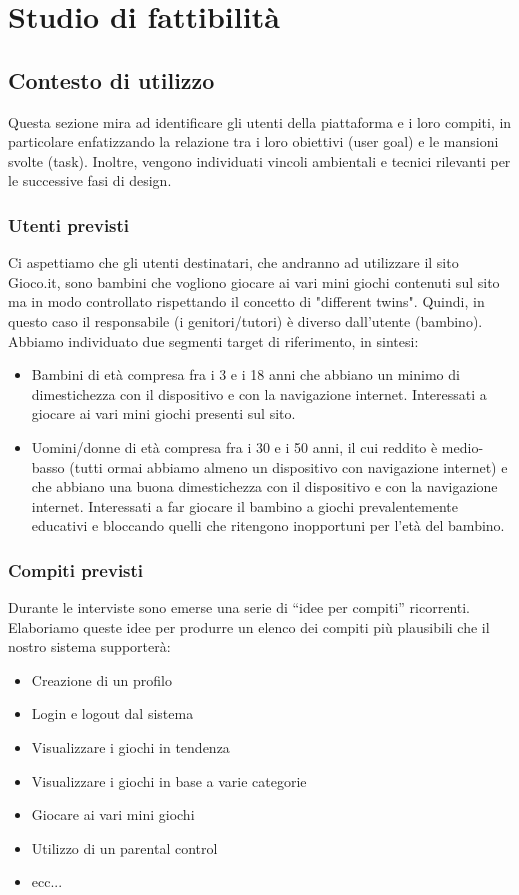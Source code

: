 \documentclass[../Report.tex]{subfiles}
\begin{document}
    \chapter{Studio di fattibilità}
    \section{Contesto di utilizzo}
    Questa sezione mira ad identificare gli utenti della piattaforma e i loro compiti, in particolare enfatizzando la relazione tra i loro obiettivi (user goal) e le mansioni svolte (task). Inoltre, vengono individuati vincoli ambientali e tecnici rilevanti per le successive fasi di design.
        
        \subsection{Utenti previsti}
        Ci aspettiamo che gli utenti destinatari, che andranno ad utilizzare il sito Gioco.it, sono bambini che vogliono giocare ai vari mini giochi contenuti sul sito ma in modo controllato rispettando il concetto di "different twins". Quindi, in questo caso il responsabile (i genitori/tutori) è diverso dall'utente (bambino).\\
        Abbiamo individuato due segmenti target di riferimento, in sintesi:
        \begin{itemize}
            \item Bambini di età compresa fra i 3 e i 18 anni che abbiano un minimo di dimestichezza con il dispositivo e con la navigazione internet. Interessati a giocare ai vari mini giochi presenti sul sito.
            \item Uomini/donne di età compresa fra i 30 e i 50 anni, il cui reddito è medio-basso (tutti ormai abbiamo almeno un dispositivo con navigazione internet) e che abbiano una buona dimestichezza con il dispositivo e con la navigazione internet. Interessati a far giocare il bambino a giochi prevalentemente educativi e bloccando quelli che ritengono inopportuni per l'età del bambino.
        \end{itemize} 

        \subsection{Compiti previsti}
        Durante le interviste sono emerse una serie di “idee per compiti” ricorrenti. Elaboriamo queste idee per produrre un elenco dei compiti più plausibili che il nostro sistema supporterà:
        \begin{itemize}
            \item Creazione di un profilo
            \item Login e logout dal sistema
            \item Visualizzare i giochi in tendenza
            \item Visualizzare i giochi in base a varie categorie
            \item Giocare ai vari mini giochi
            \item Utilizzo di un parental control
            \item ecc...
        \end{itemize}
\end{document}
